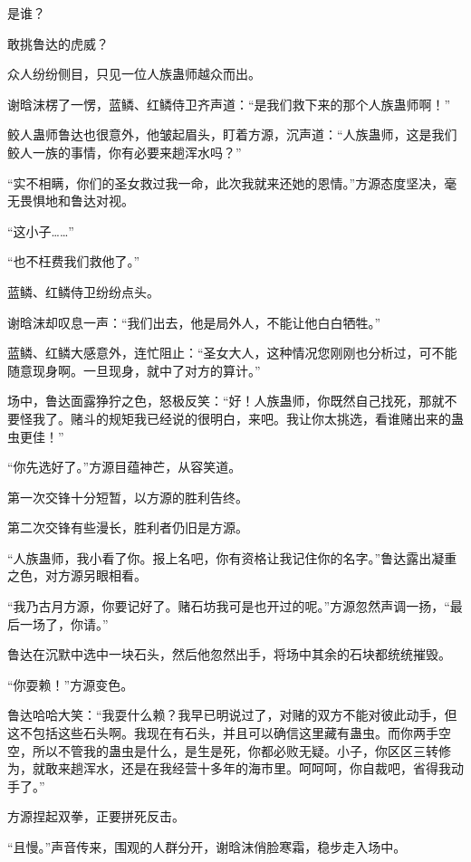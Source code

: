 \begin{this_body}
是谁？

敢挑鲁达的虎威？

众人纷纷侧目，只见一位人族蛊师越众而出。

谢晗沫楞了一愣，蓝鳞、红鳞侍卫齐声道：“是我们救下来的那个人族蛊师啊！”

鲛人蛊师鲁达也很意外，他皱起眉头，盯着方源，沉声道：“人族蛊师，这是我们鲛人一族的事情，你有必要来趟浑水吗？”

“实不相瞒，你们的圣女救过我一命，此次我就来还她的恩情。”方源态度坚决，毫无畏惧地和鲁达对视。

“这小子……”

“也不枉费我们救他了。”

蓝鳞、红鳞侍卫纷纷点头。

谢晗沫却叹息一声：“我们出去，他是局外人，不能让他白白牺牲。”

蓝鳞、红鳞大感意外，连忙阻止：“圣女大人，这种情况您刚刚也分析过，可不能随意现身啊。一旦现身，就中了对方的算计。”

场中，鲁达面露狰狞之色，怒极反笑：“好！人族蛊师，你既然自己找死，那就不要怪我了。赌斗的规矩我已经说的很明白，来吧。我让你太挑选，看谁赌出来的蛊虫更佳！”

“你先选好了。”方源目蕴神芒，从容笑道。

第一次交锋十分短暂，以方源的胜利告终。

第二次交锋有些漫长，胜利者仍旧是方源。

“人族蛊师，我小看了你。报上名吧，你有资格让我记住你的名字。”鲁达露出凝重之色，对方源另眼相看。

“我乃古月方源，你要记好了。赌石坊我可是也开过的呢。”方源忽然声调一扬，“最后一场了，你请。”

鲁达在沉默中选中一块石头，然后他忽然出手，将场中其余的石块都统统摧毁。

“你耍赖！”方源变色。

鲁达哈哈大笑：“我耍什么赖？我早已明说过了，对赌的双方不能对彼此动手，但这不包括这些石头啊。我现在有石头，并且可以确信这里藏有蛊虫。而你两手空空，所以不管我的蛊虫是什么，是生是死，你都必败无疑。小子，你区区三转修为，就敢来趟浑水，还是在我经营十多年的海市里。呵呵呵，你自裁吧，省得我动手了。”

方源捏起双拳，正要拼死反击。

“且慢。”声音传来，围观的人群分开，谢晗沫俏脸寒霜，稳步走入场中。

\end{this_body}

